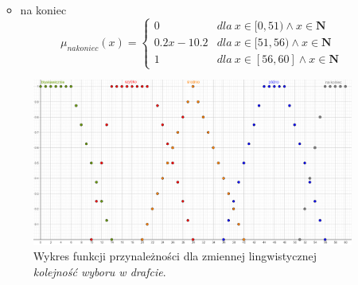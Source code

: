 \documentclass{classrep}
\begin{document}
\begin{enumerate}
\begin{itemize}
\begin{equation}
        \end{equation}
        \item na koniec
        \begin{equation}
            \mu_{nakoniec}(x) = \left\{\begin{matrix}  0 & dla \: x\in [0, 51) \wedge x\in \mathbf{N} \\ 0.2x - 10.2 & dla \: x\in[51, 56)\wedge x\in \mathbf{N} \\ 1 & dla \: x\in [56, 60]\wedge x\in \mathbf{N} \end{matrix}\right.
        \end{equation}
    \end{itemize}
    \begin{figure}[H]
        \centering
        \includegraphics[width=14cm]{wykres_draft.png}
        \caption{Wykres funkcji przynależności dla zmiennej lingwistycznej \textit{kolejność wyboru w drafcie}.}
        \label{rysunek:draft}
    \end{figure}
    

\end{enumerate}
\end{document}
